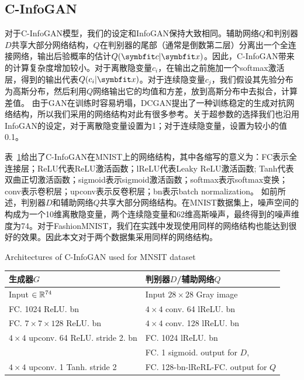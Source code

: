 \subsection{C-InfoGAN}
对于C-InfoGAN模型，我们的设定和InfoGAN保持大致相同。辅助网络$Q$和判别器$D$共享大部分网络结构，$Q$在判别器的尾部（通常是倒数第二层）分离出一个全连接网络，输出后验概率的估计$Q(\bd{c}|\bd{x})$。因此，C-InfoGAN带来的计算复杂度增加较小。对于离散隐变量$c_i$，在输出之前施加一个softmax激活层，得到的输出代表$Q(c_i|\bd{x})$。对于连续隐变量$c_j$，我们假设其先验分布为高斯分布，然后利用$Q$网络输出它的均值和方差，放到高斯分布中去拟合，计算差值。
由于GAN在训练时容易坍塌，DCGAN\citep{radford2015unsupervised}提出了一种训练稳定的生成对抗网络结构，所以我们采用的网络结构对此有很多参考。关于超参数的选择我们也沿用InfoGAN的设定，对于离散隐变量设置为1；对于连续隐变量，设置为较小的值0.1。

表~\ref{tab:m-cig-netarch}给出了C-InfoGAN在MNIST上的网络结构，其中各缩写的意义为：FC表示全连接层；ReLU代表ReLU激活函数；lReLU代表Leaky ReLU激活函数; Tanh代表双曲正切激活函数；sigmoid表示sigmoid激活函数；softmax表示softmax变换；conv表示卷积层；upconv表示反卷积层；bn表示batch normalization。
如前所述，判别器$D$和辅助网络$Q$共享大部分网络结构。在MNIST数据集上，噪声空间的构成为一个10维离散隐变量，两个连续隐变量和62维高斯噪声，最终得到的噪声维度为74。对于FashionMNIST，我们在实践中发现使用同样的网络结构也能达到很好的效果。因此本文对于两个数据集采用同样的网络结构。
\begin{table}[htbp]
  \centering
  {Architectures of C-InfoGAN used for MNSIT dataset}
  \begin{tabular}{l|l}
    \toprule
    \textbf{生成器$G$}                        & \textbf{判别器$D$/辅助网络$Q$} \\ \midrule
    Input $\in \mathbb{R}^{74}$                   & Input $28\times 28$ Gray image \\ \hline
    FC. 1024 ReLU. bn                         & $4\times 4$ conv. 64 lReLU. bn  \\ \hline
    FC. $7\times7\times128$ ReLU. bn          & $4\times 4$ conv. 128 lReLU. bn \\ \hline
    $4\times 4$ upconv. 64 ReLU. stride 2. bn & FC. 1024 lReLU. bn \\ \hline
    ~                                         & FC. 1 sigmoid. output for $D$, \\
    $4\times 4$ upconv. 1 Tanh. stride 2      & FC. 128-bn-lReRL-FC. output for $Q$ \\
    \bottomrule
  \end{tabular}
  \label{tab:m-cig-netarch}
\end{table}

